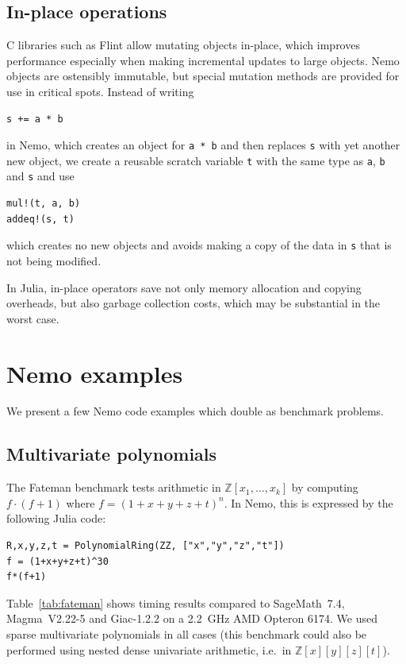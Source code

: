 \documentclass{sig-alternate-05-2015}
\begin{document}
\subsection{In-place operations}

C libraries such as Flint allow mutating
objects in-place, which improves performance
especially when making incremental updates
to large objects.
Nemo objects are ostensibly immutable,
but special mutation methods
are provided for use in critical spots.
Instead of writing
\begin{verbatim}
s += a * b
\end{verbatim}
in Nemo, which creates an object for \texttt{a * b}
and then replaces \texttt{s} with yet another new object, we
create a reusable scratch variable \texttt{t} with the same type as \texttt{a}, \texttt{b} and \texttt{s} and use
\begin{verbatim}
mul!(t, a, b)
addeq!(s, t)
\end{verbatim}
which creates no new objects and avoids making a copy of the data in \texttt{s}
that is not being modified.

In Julia, in-place operators save not only memory allocation and copying
overheads, but also
garbage collection costs, which may be substantial in the worst case.

\section{Nemo examples}
\label{sect:nemo}

We present a few Nemo code examples which double as
benchmark problems.

\subsection{Multivariate polynomials}

The Fateman benchmark
tests arithmetic in $\mathbb{Z}[x_1,\ldots,x_k]$
by computing
$f \cdot (f+1)$ where $f = (1 + x + y + z + t)^n$. In Nemo,
this is expressed by the following Julia code:

\begin{verbatim}
R,x,y,z,t = PolynomialRing(ZZ, ["x","y","z","t"])
f = (1+x+y+z+t)^30
f*(f+1)
\end{verbatim}

Table~\ref{tab:fateman} shows timing results compared to
SageMath~7.4, Magma~V2.22-5 and Giac-1.2.2
on a 2.2~GHz AMD Opteron 6174.
We used sparse multivariate polynomials in all
cases (this benchmark could also be performed
using nested dense univariate arithmetic, i.e.\ in $\mathbb{Z}[x][y][z][t]$).
\end{document}
